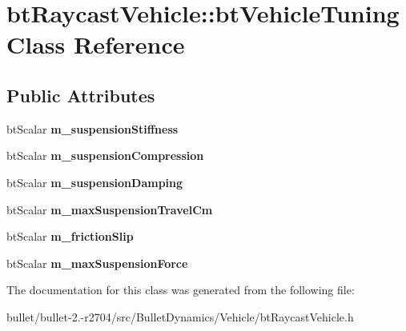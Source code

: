 \hypertarget{classbt_raycast_vehicle_1_1bt_vehicle_tuning}{\section{bt\+Raycast\+Vehicle\+:\+:bt\+Vehicle\+Tuning Class Reference}
\label{classbt_raycast_vehicle_1_1bt_vehicle_tuning}
}
\subsection*{Public Attributes}
\begin{DoxyCompactItemize}
\item 
\hypertarget{classbt_raycast_vehicle_1_1bt_vehicle_tuning_a95560af1a353c41a311441bcf0c0dd38}{bt\+Scalar {\bfseries m\+\_\+suspension\+Stiffness}}\label{classbt_raycast_vehicle_1_1bt_vehicle_tuning_a95560af1a353c41a311441bcf0c0dd38}

\item 
\hypertarget{classbt_raycast_vehicle_1_1bt_vehicle_tuning_af8b5697271ca760bcb8cd2ab9fd42c8e}{bt\+Scalar {\bfseries m\+\_\+suspension\+Compression}}\label{classbt_raycast_vehicle_1_1bt_vehicle_tuning_af8b5697271ca760bcb8cd2ab9fd42c8e}

\item 
\hypertarget{classbt_raycast_vehicle_1_1bt_vehicle_tuning_ac7c48576a8b149379d9c6c004728c1e6}{bt\+Scalar {\bfseries m\+\_\+suspension\+Damping}}\label{classbt_raycast_vehicle_1_1bt_vehicle_tuning_ac7c48576a8b149379d9c6c004728c1e6}

\item 
\hypertarget{classbt_raycast_vehicle_1_1bt_vehicle_tuning_a789f463dd10e87e5b99d3eaffbcf3de5}{bt\+Scalar {\bfseries m\+\_\+max\+Suspension\+Travel\+Cm}}\label{classbt_raycast_vehicle_1_1bt_vehicle_tuning_a789f463dd10e87e5b99d3eaffbcf3de5}

\item 
\hypertarget{classbt_raycast_vehicle_1_1bt_vehicle_tuning_a10be267c88447f74f0333e0191afb9f3}{bt\+Scalar {\bfseries m\+\_\+friction\+Slip}}\label{classbt_raycast_vehicle_1_1bt_vehicle_tuning_a10be267c88447f74f0333e0191afb9f3}

\item 
\hypertarget{classbt_raycast_vehicle_1_1bt_vehicle_tuning_a9a0b62ea981354a0de93912e776f2487}{bt\+Scalar {\bfseries m\+\_\+max\+Suspension\+Force}}\label{classbt_raycast_vehicle_1_1bt_vehicle_tuning_a9a0b62ea981354a0de93912e776f2487}

\end{DoxyCompactItemize}


The documentation for this class was generated from the following file\+:\begin{DoxyCompactItemize}
\item 
bullet/bullet-\/2.-\/r2704/src/\+Bullet\+Dynamics/\+Vehicle/bt\+Raycast\+Vehicle.\+h\end{DoxyCompactItemize}
